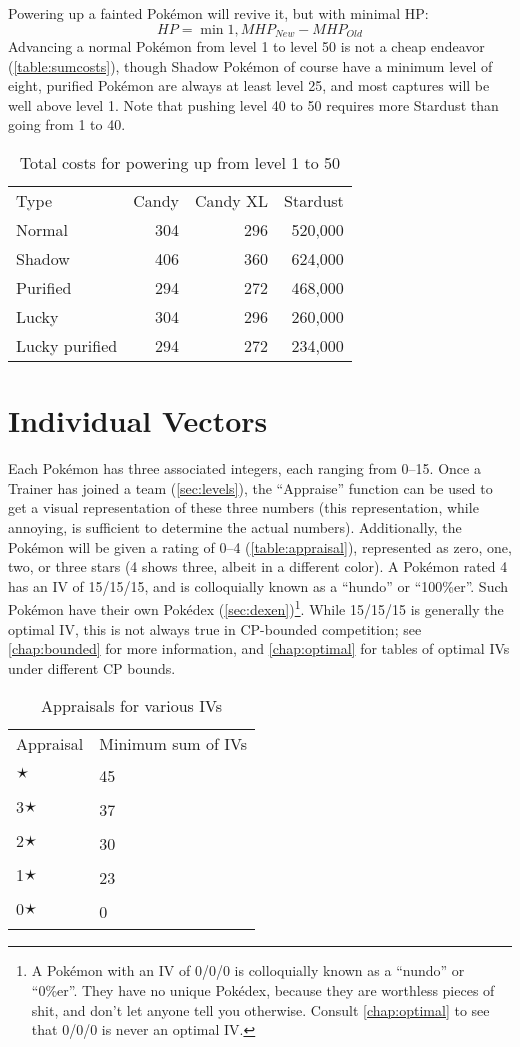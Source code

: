 Powering up a fainted Pokémon will revive it, but with minimal HP\@:
\[ HP = \min{1, MHP_{New} - MHP_{Old} } \]
Advancing a normal Pokémon from level 1 to level 50 is not a cheap endeavor (\autoref{table:sumcosts}),
  though Shadow Pokémon of course have a minimum level of eight, purified Pokémon are always
  at least level 25, and most captures will be well above level 1.
Note that pushing level 40 to 50 requires more Stardust than going from 1 to 40.
\begin{table}[ht]
\centering
\begin{tabular}{lrrr}
  Type & Candy & Candy XL & Stardust\\
\Midrule
        Normal & 304 & 296 & 520,000\\
        Shadow & 406 & 360 & 624,000\\
      Purified & 294 & 272 & 468,000\\
         Lucky & 304 & 296 & 260,000\\
Lucky purified & 294 & 272 & 234,000\\
\end{tabular}
\caption{Total costs for powering up from level 1 to 50\label{table:sumcosts}}
\end{table}

\section{Individual Vectors\label{sec:ivs}}
Each Pokémon has three associated integers, each ranging from 0--15.
Once a Trainer has joined a team (\autoref{sec:levels}), the ``Appraise'' function can be used to
  get a visual representation of these three numbers (this representation,
  while annoying, is sufficient to determine the actual numbers).
Additionally, the Pokémon will be given a rating of 0--4 (\autoref{table:appraisal}), represented as
  zero, one, two, or three stars (4 shows three, albeit in a different color).
A Pokémon rated 4 has an IV of 15/15/15, and is colloquially known as a ``hundo'' or ``100\%er''.
Such Pokémon have their own Pokédex (\autoref{sec:dexen})\footnote{A Pokémon with an IV of 0/0/0
 is colloquially known as a ``nundo'' or ``0\%er''. They have no unique Pokédex, because they are worthless pieces of shit,
  and don't let anyone tell you otherwise. Consult \autoref{chap:optimal} to see that 0/0/0 is never an optimal IV.}.
While 15/15/15 is generally the optimal IV, this is not always true in CP-bounded
  competition; see \autoref{chap:bounded} for more information,
  and \autoref{chap:optimal} for tables of optimal IVs under different CP bounds.
\begin{table}
\centering
\begin{tabular}{ll}
Appraisal & Minimum sum of IVs\\
\Midrule
4🟉 & 45\\
3🟉 & 37\\
2🟉 & 30\\
1🟉 & 23\\
0🟉 & 0\\
\end{tabular}
\caption{Appraisals for various IVs\label{table:appraisal}}
\end{table}

